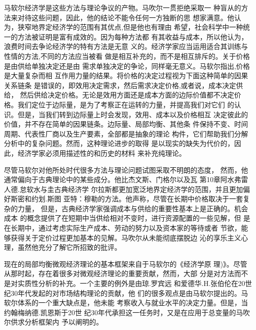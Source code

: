 马软尔经济学是这些方法与理论争议的产物。马吹尔一贯拒绝采取一
种盲从的方法来对待这些问题，因此，他的结论不能令任何一方独断的思
想家满意。他认为，狭窄地界定经济学的范围有其优点,但是他也有理由
希望，社会科学中一种统一的方法被证明是富有成效的。因为每种方法都
有其收益与成本，所以他认为，浪费时间去争论经济学的特有方法是无意
义的。经济学家应当运用适合其训练与性情的方法,不同的方法应当被看
做是相互补充的，而不是相互排斥的。关于价格是由供给单独决定还是由
需求单独决定的争论，同样毫无意义。马软尔指出,价格是大量复杂而相
互作用力量的结果。将价格的决定过程视为下面这种简单的因果关系链条
是错误的，即效用决定需求，然后需求决定价格,或者说，成本决定供给，
然后供给决定价格。无论是效用方面还是成本方面的边际价值都不决定价
格。我们定位于边际量，是为了考察正在运转的力量，并提高我们对它们
的认识。但是，当我们转到边际量上时会发现，效用、成本以及价格相互
决定彼此的价值，并不存在简单的因果链条。边际量、局部均衡、其他条
件保持不变、时间周期、代表性厂商以及生产要素，全部都是抽象的理论
构件，它们帮助我们分解分析中的复杂问题。然而，这种理论进步的取得
是以现实的缺失为代价的，因此，经济学家必须用描述性的和历史的材料
来补充纯理论。

尽管马软尔对他所处时代很多方法与理论问题试图采取不明朗的态度，
然而，他通常偏向于古典理论中的某些成分。他比杰文斯、门格尔以及瓦
第10章阿水弗雷人德.怠软水与圭古典经济学
尔拉斯都更加宽泛地界定经济学的范围，并且更加偏好斯密和约划.斯图
亚特：穆勒的方法。他声称，尽管在长期中价格取决于一套复杂的力量，
但是，古典经济学家强调成本与供给的重要性基本上是正确的。机会成本
的概念提供了在短期中当供给相对不变时，进行资源配置的一些见解，但
是在长期中，通过考虑实际生产成本、劳动的努力以及资本家的等待或者
节欲，能够获得关于定价过程更加基本的见解。马吹尔从未能彻底摆脱边
沁的享乐主义心理，虽然他充分了解它所招致的批评。

现在的局部均衡微观经济理论的基本框架来自于马软尔的《经济学原
理)》。尽管从那时起，存在着很多对微观经济理论的重要贡献，然而，大部
分是对方法而不是对实质性分析的补充。一个主要的例外是由琼.罗宾远
和爱德华.H.张伯伦在20世纪30年代发起的对市场结构理论的贡献，他
们的很多观点是由马软尔提出的。马软尔体系的一个重大缺点是，他未能
考察收入与就业水平的决定力量。但是，当约翰梅纳德.凯恩斯于20世
纪30年代承担这一任务时，又是在应用于总变量的马吹尔供求分析框架内
予以阐明的。
